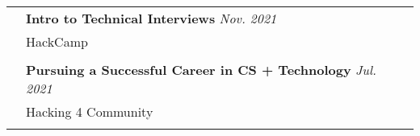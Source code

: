 \documentclass[letterpaper, 11pt]{article}
\begin{document}
\begin{longtable}{p{1.3in}p{4.8in}}
	 & \textbf{Intro to Technical Interviews} \hfill \textit{Nov. 2021}                                                                                                                                                                                                                                                                                                                          \\
	 & HackCamp                                                                                                                                                                                                                                                                                                                                                                                  \\
	 &                                                                                                                                                                                                                                                                                                                                                                                           \\

	 & \textbf{Pursuing a Successful Career in CS + Technology} \hfill \textit{Jul. 2021}                                                                                                                                                                                                                                                                                                        \\
	 & Hacking 4 Community                                                                                                                                                                                                                                                                                                                                                                       \\
	 &                                                                                                                                                                                                                                                                                                                                                                                           \\


\end{longtable}
\end{document}
